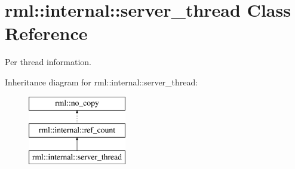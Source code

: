 \hypertarget{classrml_1_1internal_1_1server__thread}{}\section{rml\+:\+:internal\+:\+:server\+\_\+thread Class Reference}
\label{classrml_1_1internal_1_1server__thread}


Per thread information.  


Inheritance diagram for rml\+:\+:internal\+:\+:server\+\_\+thread\+:\begin{figure}[H]
\begin{center}
\leavevmode
\includegraphics[height=3.000000cm]{classrml_1_1internal_1_1server__thread}
\end{center}
\end{figure}
